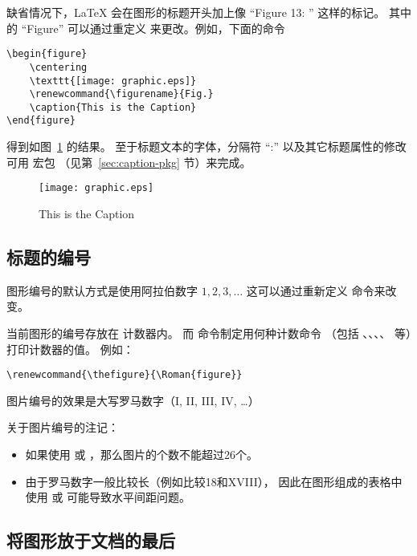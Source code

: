 缺省情况下，\LaTeX{} 会在图形的标题开头加上像 ``Figure 13: '' 这样的标记。
其中的 ``Figure'' 可以通过重定义  来更改。例如，下面的命令
\begin{lstlisting}
\begin{figure} 
	\centering 
	\texttt{[image: graphic.eps]} 
	\renewcommand{\figurename}{Fig.} 
	\caption{This is the Caption} 
\end{figure}
\end{lstlisting}
得到如图~\ref{fig:figname} 的结果。
至于标题文本的字体，分隔符 ``:'' 以及其它标题属性的修改可用  宏包
（见第~\ref{sec:caption-pkg} 节）来完成。

\begin{figure} 
	\centering 
	\texttt{[image: graphic.eps]} 
	\renewcommand{\figurename}{Fig.} 
	\caption{This is the Caption}\label{fig:figname} 
\end{figure}

\subsection{标题的编号}

图形编号的默认方式是使用阿拉伯数字 $1,2,3,\dots$
这可以通过重新定义  命令来改变。

当前图形的编号存放在  计数器内。
而  命令制定用何种计数命令
（包括 、、、、 等）打印计数器的值。
例如：
\begin{lstlisting}
\renewcommand{\thefigure}{\Roman{figure}}
\end{lstlisting}
图片编号的效果是大写罗马数字（I, II, III, IV, \dots）

关于图片编号的注记：
\begin{itemize}
	\item 如果使用  或 ，那么图片的个数不能超过26个。
	\item 由于罗马数字一般比较长（例如比较18和XVIII），
	因此在图形组成的表格中使用  或  可能导致水平间距问题。
\end{itemize}

\subsection{将图形放于文档的最后}\label{ssec:endfloat}

